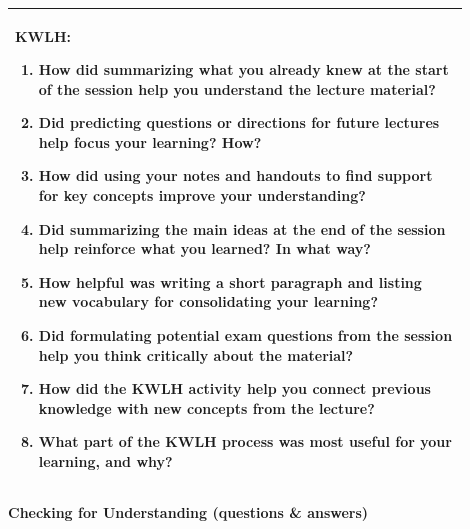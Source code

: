 \documentclass{article}
\begin{document}
\begin{tabular}{|p{0.9\linewidth}|}
\hline
\vspace{0.2cm}
\textbf{KWLH:}
\begin{enumerate}
    \item How did summarizing what you already knew at the start of the session help you understand the lecture material?  
    \item Did predicting questions or directions for future lectures help focus your learning? How?  
    \item How did using your notes and handouts to find support for key concepts improve your understanding?  
    \item Did summarizing the main ideas at the end of the session help reinforce what you learned? In what way?  
    \item How helpful was writing a short paragraph and listing new vocabulary for consolidating your learning?  
    \item Did formulating potential exam questions from the session help you think critically about the material?  
    \item How did the KWLH activity help you connect previous knowledge with new concepts from the lecture?  
    \item What part of the KWLH process was most useful for your learning, and why?  
\end{enumerate} \\
\hline
\end{tabular}
\newpage

\noindent
{\large\textbf{Checking for Understanding (questions \& answers)}}\\
\end{document}
